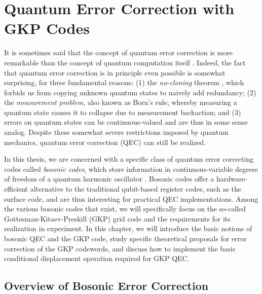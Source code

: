 \chapter{Quantum Error Correction with GKP Codes\label{ch:2_QEC}}

It is sometimes said that the concept of quantum error correction is more remarkable than the concept of quantum computation itself \cite{girvin2019QECvideo}. Indeed, the fact that quantum error correction is in principle even possible is somewhat surprising, for three fundamental reasons: (1) the \textit{no-cloning} theorem \cite{ike-and-mike}, which forbids us from copying unknown quantum states to naively add redundancy; (2) the \textit{measurement problem}, also known as Born's rule, whereby measuring a quantum state causes it to collapse due to measurement backaction; and (3) errors on quantum states can be continuous-valued and are thus in some sense analog. Despite these somewhat severe restrictions imposed by quantum mechanics, quantum error correction (QEC) can still be realized. 


In this thesis, we are concerned with a specific class of quantum error correcting codes called \textit{bosonic codes}, which store information in continuous-variable degrees of freedom of a quantum harmonic oscillator \cite{terhal2020bosonic, cai2021bosonic, joshi2021bosonic}. Bosonic codes offer a hardware-efficient alternative to the traditional qubit-based register codes, such as the surface code, and are thus interesting for practical QEC implementations. Among the various bosonic codes that exist, we will specifically focus on the so-called Gottesman-Kitaev-Preskill (GKP) grid code and the requirements for its realization in experiment. In this chapter, we will introduce the basic notions of bosonic QEC and the GKP code, study specific theoretical proposals for error correction of the GKP codewords, and discuss how to implement the basic conditional displacement operation required for GKP QEC.

\section{Overview of Bosonic Error Correction}
